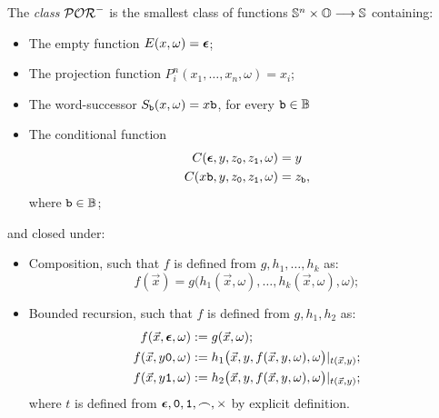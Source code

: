 \begin{defn}
The \emph{class $\mathcal{POR}^-$}
is the smallest class of functions
$\mathbb{S}^n\times \mathbb{O}\longrightarrow \mathbb{S}$ containing:
\begin{itemize}
\itemsep0em

\item The empty function $E(x,\omega)=\bm{\epsilon}$;

\item The projection function
$P^{n}_i(x_1,\dots, x_n,\omega)=x_i$;

\item The word-successor $S_{\mathtt{b}}(x,\omega) = x\mathtt{b}$,
for every $\mathtt{b} \in \mathbb{B}$

\item The conditional function
\begin{align*}
C(\bm{\epsilon}, y, z_{\mathtt{0}}, z_{\mathtt{1}},\omega) &= y \\
C(x\mathtt{b}, y, z_{\mathtt{0}}, z_{\mathtt{1}},\omega) &= z_{\mathtt{b}},
\end{align*}
where $\mathtt{b} \in \mathbb{B}$;
\end{itemize}
and closed under:
\begin{itemize}
\item Composition, such that $f$ is defined from
$g,h_1,\dots, h_k$ as:
$$
f(\vec{x}) = g\big(
h_1(\vec{x},\omega), \dots, h_k(\vec{x},\omega),\omega\big);
$$


\item Bounded recursion, such that $f$ is defined from
$g, h_1, h_2$ as:
\begin{align*}
f(\vec{x},\eepsilon,\omega) &:= g(\vec{x},\omega); \\
%
f(\vec{x}, y\zero,\omega) &:= h_1
\big(\vec{x}, y,
 f(\vec{x},y,\omega),\omega\big)|_{t(\vec{x},y)}; \\
%
f(\vec{x}, y\one,\omega) &:=
h_2\big(\vec{x}, y,
f(\vec{x}, y,\omega),\omega\big)|_{t(\vec{x},y)};
\end{align*}
\noindent
where $t$ is defined from $\bm{\epsilon}, \mathtt{0}, \mathtt{1},
\frown, \times$ by explicit definition.
\end{itemize}
\end{defn}


